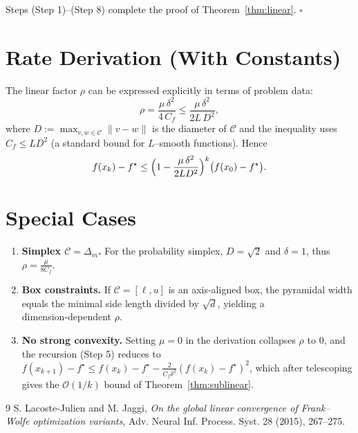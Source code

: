\documentclass{article}
\newcommand{\C}{\mathcal{C}}
\begin{document}
Steps (Step 1)–(Step 8) complete the proof of Theorem~\ref{thm:linear}.
\hfill $\square$

\section*{Rate Derivation (With Constants)}
The linear factor $\rho$ can be expressed explicitly in terms of problem data:
\[
\rho = \frac{\mu\,\delta^{2}}{4\,C_{f}}
      \le \frac{\mu\,\delta^{2}}{2L\,D^{2}},
\]
where $D:=\max_{v,w\in\C}\|v-w\|$ is the diameter of $\C$ and the inequality uses
$C_{f}\le L D^{2}$ (a standard bound for $L$–smooth functions).  Hence
\[
f(x_{k})-f^{\star}\le
\Bigl(1-\frac{\mu\,\delta^{2}}{2L D^{2}}\Bigr)^{k}
\bigl(f(x_{0})-f^{\star}\bigr).
\]

\section*{Special Cases}
\begin{enumerate}
\item \textbf{Simplex $\C=\Delta_{m}$.}  For the probability simplex,
$D=\sqrt{2}$ and $\delta=1$, thus $\rho=\frac{\mu}{8 C_{f}}$.
\item \textbf{Box constraints.}  If $\C=[\ell,u]$ is an axis‑aligned box,
the pyramidal width equals the minimal side length divided by $\sqrt{d}$,
yielding a dimension‑dependent $\rho$.
\item \textbf{No strong convexity.}  Setting $\mu=0$ in the derivation collapses
$\rho$ to $0$, and the recursion (Step 5) reduces to
$f(x_{k+1})-f^{\star}\le f(x_{k})-f^{\star}
-\frac{2}{C_{f}\delta^{2}}(f(x_{k})-f^{\star})^{2}$,
which after telescoping gives the $\mathcal{O}(1/k)$ bound of
Theorem~\ref{thm:sublinear}.
\end{enumerate}

\begin{thebibliography}{9}
S. Lacoste-Julien and M. Jaggi,
\emph{On the global linear convergence of Frank–Wolfe optimization variants},
Adv. Neural Inf. Process. Syst. 28 (2015), 267–275.
\end{thebibliography}
\end{document}
